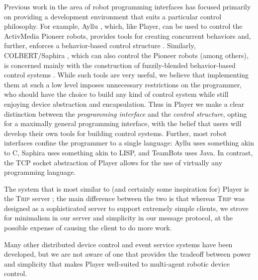 \label{related}
Previous work in the area of robot programming interfaces has focused
primarily on providing a development environment that suits a
particular control philosophy.  For example, Ayllu \cite{Werger00},
which, like Player, can be used to control the ActivMedia Pioneer robots,
provides tools for creating concurrent behaviors and, further,
enforces a behavior-based control structure \cite{Arkin98}.  Similarly,
COLBERT/Saphira \cite{Konolige97}, which can also control the Pioneer
robots (among others), is concerned mainly with the construction of
fuzzily-blended behavior-based control systems
\cite{SaffiottiRuspiniKonolige93}.  While such tools are very useful,
we believe that implementing them at such a low level imposes
unnecessary restrictions on the programmer, who should have the choice
to build any kind of control system while still enjoying device
abstraction and encapsulation. Thus in Player
we make a clear distinction between the {\sl programming interface} and 
the {\sl control structure}, opting for a maximally
general programming interface, with the belief that users will develop
their own tools for building control systems.  Further, most
robot interfaces confine the programmer to a single language:
Ayllu uses something akin to C, Saphira uses something akin
to LISP, and TeamBots \cite{balch98} uses Java.  
In contrast, the TCP socket abstraction of Player allows for the 
use of virtually any programming language.

The system that is most similar to (and certainly some inspiration
for) Player is the {\scshape Trip} server \cite{Jennings98}; the main
difference between the two is that whereas {\scshape Trip} was
designed as a sophisticated server to support extremely simple
clients, we strove for minimalism in our server and simplicity in our
message protocol, at the possible expense of causing the client to do
more work.

Many other distributed device control and event service systems have
been developed, but we are not aware of one that provides the tradeoff
between power and simplicity that makes Player well-suited to
multi-agent robotic device control.


